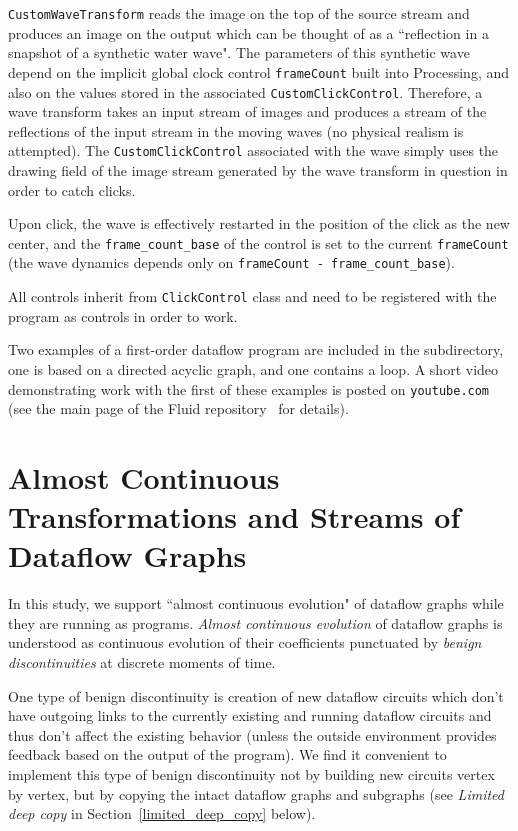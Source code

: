 \documentclass{llncs}
\begin{document}
{\tt CustomWaveTransform} reads the image on the top of the source stream and
produces an image on the output which can be thought of as a ``reflection in a snapshot of
a synthetic water wave". The parameters of this synthetic wave depend on the
implicit global clock control {\tt frameCount} built into Processing, and
also on the values stored in the associated {\tt CustomClickControl}.
Therefore, a wave transform takes an input stream of images and produces
a stream of the reflections of the input stream in the moving waves
(no physical realism is attempted).  The {\tt CustomClickControl}
associated with the wave simply uses the drawing field of the image stream generated
by the wave transform in question in order to catch clicks. 

Upon click, the wave is effectively restarted in the
position of the click as the new center, and the {\tt frame\_count\_base} of the control
is set to the current {\tt frameCount} (the wave dynamics depends only on {\tt frameCount - frame\_count\_base}).

All controls inherit from {\tt ClickControl} class and need to be registered with
the program as controls in order to work.

Two examples of a first-order dataflow program are included in the subdirectory,
one is based on a directed acyclic graph, and one contains a loop. A short video
demonstrating work with the first of these examples is posted on {\tt youtube.com} (see the main page of the Fluid repository~\cite{Fluid}
for details).


\section{Almost Continuous Transformations and Streams of Dataflow Graphs}\label{continuous}

In this study, we support ``almost continuous evolution" of dataflow graphs while they are
running as programs. {\em Almost continuous evolution} of dataflow graphs is understood
as continuous evolution of their coefficients punctuated by {\em benign discontinuities}
at discrete moments of time.

One type of benign discontinuity is creation of new dataflow circuits which don't have
outgoing links to the currently existing and running dataflow circuits and thus don't affect
the existing behavior (unless the outside environment provides feedback based
on the output of the program). We find it convenient to implement this type of benign discontinuity
not by building new circuits vertex by vertex, but by copying the intact dataflow graphs
and subgraphs (see {\em Limited deep copy} in Section~\ref{limited_deep_copy} below).
\end{document}
